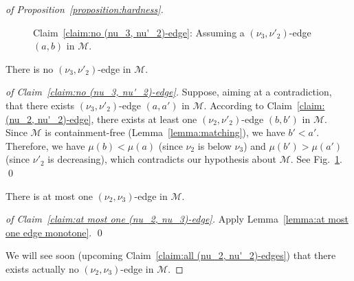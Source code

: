 \begin{proof}[of Proposition~\ref{proposition:hardness}]
\begin{figure}[t!]
    \caption{\label{fig:subfig:no (nu_3, nu'_2)-edge}%
      Claim~\ref{claim:no (nu_3, nu'_2)-edge}:
      Assuming a $(\nu_3, \nu'_2)$-edge $(a, b)$ in $\mathcal{M}$.
    }
  \end{figure}

  \begin{claim}
    \label{claim:no (nu_3, nu'_2)-edge}
    There is no $(\nu_3, \nu'_2)$-edge in $\mathcal{M}$.
  \end{claim}

  \begin{proof}[of Claim~\ref{claim:no (nu_3, nu'_2)-edge}]
    Suppose, aiming at a contradiction, that there exists
    $(\nu_3, \nu'_2)$-edge $(a, a')$ in $\mathcal{M}$.
    According to Claim~\ref{claim:(nu_2, nu'_2)-edge}, there
    exists at least one $(\nu_2, \nu'_2)$-edge $(b, b')$ in $\mathcal{M}$.
    Since $\mathcal{M}$ is containment-free (Lemma~\ref{lemma:matching}),
    we have $b' < a'$.
    Therefore,
    we have $\mu(b) < \mu(a)$ (since $\nu_2$ is below $\nu_3$) and
    $\mu(b') > \mu(a')$ (since $\nu'_2$ is decreasing),
    which contradicts our hypothesis about $\mathcal{M}$.
    See Fig.~\ref{fig:subfig:no (nu_3, nu'_2)-edge}.
    \qed
  \end{proof}

  \begin{claim}
    \label{claim:at most one (nu_2, nu_3)-edge}
    There is at most one $(\nu_2, \nu_3)$-edge
    in $\mathcal{M}$.
  \end{claim}

  \begin{proof}[of Claim~\ref{claim:at most one (nu_2, nu_3)-edge}]
    Apply Lemma~\ref{lemma:at most one edge monotone}.
    \qed
  \end{proof}

    We will see soon (upcoming Claim~\ref{claim:all (nu_2, nu'_2)-edges})
    that there exists actually no $(\nu_2, \nu_3)$-edge
    in $\mathcal{M}$.


\end{proof}
